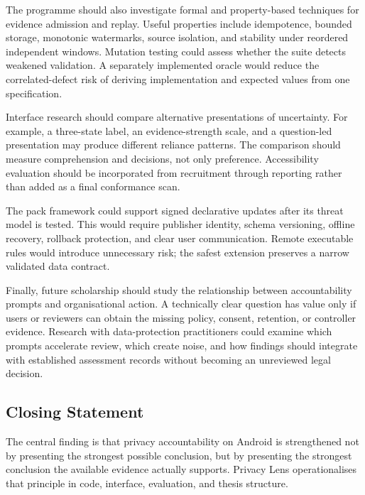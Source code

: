 The programme should also investigate formal and property-based techniques for evidence admission and replay. Useful properties include idempotence, bounded storage, monotonic watermarks, source isolation, and stability under reordered independent windows. Mutation testing could assess whether the suite detects weakened validation. A separately implemented oracle would reduce the correlated-defect risk of deriving implementation and expected values from one specification.

Interface research should compare alternative presentations of uncertainty. For example, a three-state label, an evidence-strength scale, and a question-led presentation may produce different reliance patterns. The comparison should measure comprehension and decisions, not only preference. Accessibility evaluation should be incorporated from recruitment through reporting rather than added as a final conformance scan.

The pack framework could support signed declarative updates after its threat model is tested. This would require publisher identity, schema versioning, offline recovery, rollback protection, and clear user communication. Remote executable rules would introduce unnecessary risk; the safest extension preserves a narrow validated data contract.

Finally, future scholarship should study the relationship between accountability prompts and organisational action. A technically clear question has value only if users or reviewers can obtain the missing policy, consent, retention, or controller evidence. Research with data-protection practitioners could examine which prompts accelerate review, which create noise, and how findings should integrate with established assessment records without becoming an unreviewed legal decision.

\subsection{Closing Statement}

The central finding is that privacy accountability on Android is strengthened not by presenting the strongest possible conclusion, but by presenting the strongest conclusion the available evidence actually supports. Privacy Lens operationalises that principle in code, interface, evaluation, and thesis structure.
